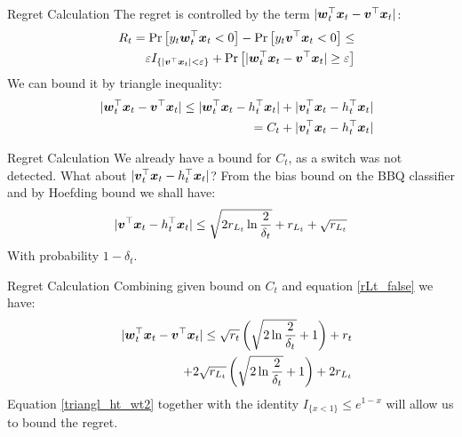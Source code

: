 \documentclass{beamer}
\begin{document}
\begin{frame}{Regret Calculation}
The regret is controlled by the term $|{{\boldsymbol{w}}}^{\top}_{t}{\boldsymbol{x}}_{t}-{{\boldsymbol{v}}}^{\top}{\boldsymbol{x}}_{t}|$:
\begin{eqnarray}
&&R_t={\rm Pr}\left[{y_t{{\boldsymbol{w}}}^{\top}_{t}{\boldsymbol{x}}_{t}<0}\right]-{\rm Pr}\left[{y_t{{\boldsymbol{v}}}^{\top}{\boldsymbol{x}}_{t}<0}\right]\leq\nonumber\\
&&\varepsilon I_{\{|{{\boldsymbol{v}}}^{\top}{\boldsymbol{x}}_{t}|<\varepsilon\}}+{\rm Pr}\left[{|{{\boldsymbol{w}}}^{\top}_{t}{\boldsymbol{x}}_{t}-{{\boldsymbol{v}}}^{\top}{\boldsymbol{x}}_{t}|\geq\varepsilon}\right]
\label{regret_wt_ht1}
\end{eqnarray}
We can bound it by triangle inequality:
\begin{eqnarray}
&&\vert{{\boldsymbol{w}}}^{\top}_{t}{\boldsymbol{x}}_{t}-{{\boldsymbol{v}}}^{\top}{\boldsymbol{x}}_{t}\vert\leq\vert{{\boldsymbol{w}}}^{\top}_{t}{\boldsymbol{x}}_{t}-h_{t}^{\top}{\boldsymbol{x}}_{t}\vert+\vert{{\boldsymbol{v}}}^{\top}_{t}{\boldsymbol{x}}_{t}-h_{t}^{\top}{\boldsymbol{x}}_{t}\vert\nonumber\\
&&=C_t+\vert{{\boldsymbol{v}}}^{\top}_{t}{\boldsymbol{x}}_{t}-h_{t}^{\top}{\boldsymbol{x}}_{t}\vert
\label{triangl_ht_wt}
\end{eqnarray}
\end{frame}

\begin{frame}{Regret Calculation}
We already have a bound for $C_t$, as a switch was not detected. What about $\vert{{\boldsymbol{v}}}^{\top}_{t}{\boldsymbol{x}}_{t}-h_{t}^{\top}{\boldsymbol{x}}_{t}\vert$?\newline\newline
From the bias bound on the BBQ classifier and by Hoefding bound we shall have:
\begin{equation}
\vert{{\boldsymbol{v}}}^{\top}{\boldsymbol{x}}_{t}-h_{t}^{\top}{\boldsymbol{x}}_{t}\vert\leq\sqrt{2r_{L_t}\ln{\frac{2}{\delta_t}}}+r_{L_t}+\sqrt{r_{L_t}}
\label{rLt_false}
\end{equation}
With probability $1-\delta_t$.
\end{frame}



\begin{frame}{Regret Calculation}
Combining given bound on $C_t$ and equation \ref{rLt_false} we have:
\begin{eqnarray}
&&\vert{{\boldsymbol{w}}}^{\top}_{t}{\boldsymbol{x}}_{t}-{{\boldsymbol{v}}}^{\top}{\boldsymbol{x}}_{t}\vert\leq\sqrt{r_t}\left(\sqrt{2\ln{\frac{2}{\delta_t}}}+1\right)+r_t\nonumber\\
&&+2\sqrt{r_{L_t}}\left(\sqrt{2\ln{\frac{2}{\delta_t}}}+1\right)+2r_{L_t}
\label{triangl_ht_wt2}
\end{eqnarray}
Equation \ref{triangl_ht_wt2} together with the identity  $I_{\{x<1\}}\leq e^{1-x}$ will allow us to bound the regret.
\end{frame}
\end{document}
